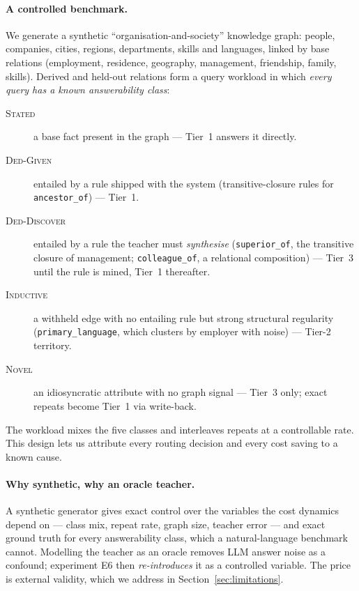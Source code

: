 \documentclass[11pt]{article}
\theoremstyle{plain}
\begin{document}
\paragraph{A controlled benchmark.} We generate a synthetic
``organisation-and-society'' knowledge graph: people, companies, cities,
regions, departments, skills and languages, linked by base relations
(employment, residence, geography, management, friendship, family,
skills). Derived and held-out relations form a query workload in which
\emph{every query has a known answerability class}:
\begin{description}
  \item[\textsc{Stated}] a base fact present in the graph --- Tier~1
  answers it directly.
  \item[\textsc{Ded-Given}] entailed by a rule shipped with the system
  (transitive-closure rules for \texttt{ancestor\_of}) --- Tier~1.
  \item[\textsc{Ded-Discover}] entailed by a rule the teacher must
  \emph{synthesise} (\texttt{superior\_of}, the transitive closure of
  management; \texttt{colleague\_of}, a relational composition) --- Tier~3
  until the rule is mined, Tier~1 thereafter.
  \item[\textsc{Inductive}] {\sloppy a withheld edge with no entailing rule but
  strong structural regularity (\texttt{primary\_language}, which clusters
  by employer with noise) --- Tier-2 territory.\par}
  \item[\textsc{Novel}] an idiosyncratic attribute with no graph signal ---
  Tier~3 only; exact repeats become Tier~1 via write-back.
\end{description}
The workload mixes the five classes and interleaves repeats at a
controllable rate. This design lets us attribute every routing decision and
every cost saving to a known cause.

\paragraph{Why synthetic, why an oracle teacher.} A synthetic generator
gives exact control over the variables the cost dynamics depend on ---
class mix, repeat rate, graph size, teacher error --- and exact ground
truth for every answerability class, which a natural-language benchmark
cannot. Modelling the teacher as an oracle removes LLM answer noise as a
confound; experiment E6 then \emph{re-introduces} it as a controlled
variable. The price is external validity, which we address in
Section~\ref{sec:limitations}.
\end{document}

